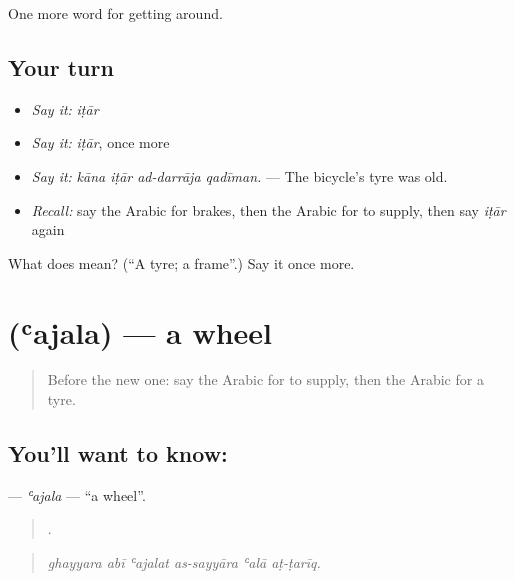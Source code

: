 \begin{grammarlens}[title={What you've built}]
One more word for getting around.
\end{grammarlens}

\subsection*{Your turn}
\begin{itemize}
\raggedright
  \item \emph{Say it:} \emph{iṭār}
  \item \emph{Say it:} \emph{iṭār}, once more
  \item \emph{Say it:} \emph{kāna iṭār ad-darrāja qadīman.} — The bicycle's tyre was old.
  \item \emph{Recall:} say the Arabic for brakes, then the Arabic for to supply, then say \emph{iṭār} again
\end{itemize}

\begin{tcolorbox}[breakable,colback=teal!4,colframe=teal!35!black,title={Before you move on}]
What does  mean? (\textquotedblleft{}A tyre; a frame\textquotedblright{}.) Say it once more.
\end{tcolorbox}
\section[\texorpdfstring{\ar{عجلة} (ʿajala)}{عجلة (ʿajala)}]{ (ʿajala) — a wheel}

\label{lesson:AR-C433-ajala}



\begin{quote}
Before the new one: say the Arabic for to supply, then the Arabic for a tyre.
\end{quote}

\subsection*{You'll want to know: }
\textbf{} — \emph{ʿajala} — \textquotedblleft{}a wheel\textquotedblright{}.

\begin{quote}
     .
\end{quote}

\begin{quote}
\emph{ghayyara abī ʿajalat as-sayyāra ʿalā aṭ-ṭarīq.}
\end{quote}

